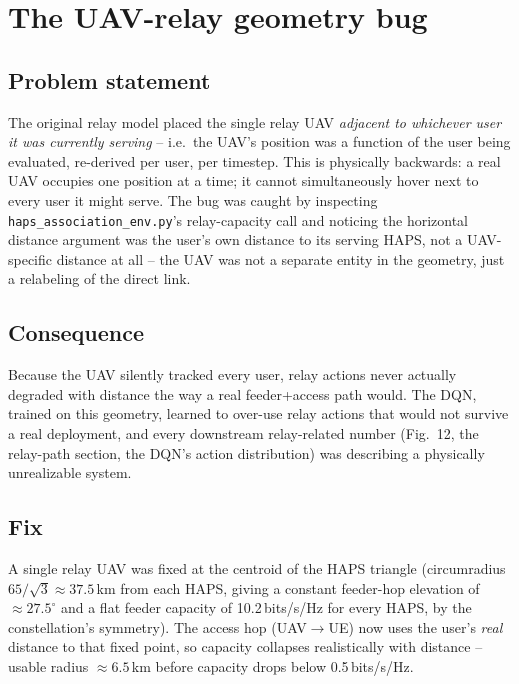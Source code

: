 \documentclass[11pt]{article}
\begin{document}
\section{The UAV-relay geometry bug}
\label{sec:uav-bug}

\subsection{Problem statement}
The original relay model placed the single relay UAV \emph{adjacent to whichever user
it was currently serving} -- i.e.\ the UAV's position was a function of the user being
evaluated, re-derived per user, per timestep. This is physically backwards: a real UAV
occupies one position at a time; it cannot simultaneously hover next to every user it
might serve. The bug was caught by inspecting \texttt{haps\_association\_env.py}'s
relay-capacity call and noticing the horizontal distance argument was the user's own
distance to its serving HAPS, not a UAV-specific distance at all -- the UAV was not a
separate entity in the geometry, just a relabeling of the direct link.

\subsection{Consequence}
Because the UAV silently tracked every user, relay actions never actually degraded with
distance the way a real feeder+access path would. The DQN, trained on this geometry,
learned to over-use relay actions that would not survive a real deployment, and every
downstream relay-related number (Fig.~12, the relay-path section, the DQN's action
distribution) was describing a physically unrealizable system.

\subsection{Fix}
A single relay UAV was fixed at the centroid of the HAPS triangle (circumradius
$65/\sqrt{3}\approx37.5$\,km from each HAPS, giving a constant feeder-hop elevation of
$\approx27.5^\circ$ and a flat feeder capacity of 10.2\,bits/s/Hz for every HAPS, by the
constellation's symmetry). The access hop (UAV$\to$UE) now uses the user's \emph{real}
distance to that fixed point, so capacity collapses realistically with distance --
usable radius $\approx6.5$\,km before capacity drops below 0.5\,bits/s/Hz.
\end{document}
